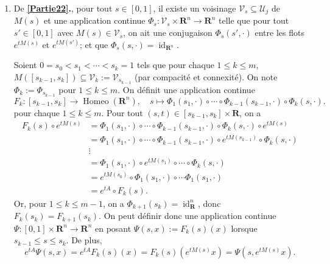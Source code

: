 \documentclass[french, 12pt]{article}
\theoremstyle{definition}
\newcommand{\Rbb}{\mathbf{R}}
\newcommand{\Ucal}{\mathcal{U}}
\newcommand{\Vcal}{\mathcal{V}}
\newcommand{\id}{\operatorname{id}}
\newcommand{\Homeo}{\operatorname{Homeo}}
\newcommand{\diag}{\operatorname{diag}}
\begin{document}
\begin{enumerate}
\begin{enumerate}
        \item De m\^eme, on peut trouver les chemins $c_k$ reliant $C_k$ \`a $\diag[-1,\ldots,-1]$ ($1 \le k \le u$) tel que les valeurs propres de $c_k(t)$ sont n\'egatives pour tout $t \in [0,1]$; et les chemins $d_k$ reliant $D_k$ \`a $\diag[-1,\ldots,-1]$ ($1 \le k \le v$) tel que les valeurs propres de $d_k(t)$ sont de partie r\'eelle n\'egative pour tout $t \in [0,1]$.
        \end{enumerate}
        
        Ainsi, on a un chemin
            $$h:=\diag[a_1,\ldots,a_r,b_1,\ldots,b_s,c_1,\ldots,c_u,d_1,\ldots,d_v] : [0,1] \to \Ucal_j$$
        reliant $h(0) = H$ \`a $h(1) = I_j$. En cons\'equence, on a une chemin
            $$\forall t \in [0,1], \qquad m(t):=p(t)h(t)p(t)^{-1} \in \Ucal_j$$
        reliant $m(0) = PHP^{-1} = M$ \`a $m(1) = I_j$ dans $\Ucal_j$. Donc $\Ucal_j$ est connexe par arcs.
        
        \item \label{Partie24} De {\bf \ref{Partie22}.}, pour tout $s \in [0,1]$, il existe un voisinage $\Vcal_s \subseteq \Ucal_j$ de $M(s)$ et une application continue $\Phi_s: \Vcal_s \times \Rbb^n \to \Rbb^n$ telle que pour tout $s' \in [0,1]$ avec $M(s) \in \Vcal_s$, on ait une conjugaison $\Phi_s(s',\cdot)$ entre les flots $e^{tM(s)}$ et $e^{tM(s')}$; et que $\Phi_s(s,\cdot) = \id_{\Rbb^n}$.
        
        Soient $0 = s_0 < s_1 < \cdots < s_k = 1$ tels que pour chaque $1 \le k \le m$, $M([s_{k-1},s_k]) \subseteq \Vcal_k:=\Vcal_{s_{k-1}}$ (par compacit\'e et connexit\'e). On note $\Phi_k:=\Phi_{s_{k-1}}$ pour $1 \le k \le m$. On d\'efinit une application continue 
            $$F_k: [s_{k-1},s_k] \to \Homeo(\Rbb^n), \quad s \mapsto \Phi_1(s_1,\cdot) \circ \cdots \circ \Phi_{k-1}(s_{k-1},\cdot) \circ  \Phi_k(s,\cdot).$$
        pour chaque $1 \le k \le m$. Pour tout $(s,t) \in [s_{k-1}, s_k] \times \Rbb$, on a
            \begin{align*}
                F_k(s) \circ e^{tM(s)} & = \Phi_1(s_1,\cdot) \circ \cdots \circ \Phi_{k-1}(s_{k-1},\cdot) \circ  \Phi_k(s,\cdot) \circ e^{tM(s)} \\
                & = \Phi_1(s_1,\cdot) \circ \cdots \circ \Phi_{k-1}(s_{k-1},\cdot) \circ e^{tM(s_{k-1})} \circ  \Phi_k(s,\cdot)\\
                & \vdots \\
                & = \Phi_1(s_1,\cdot) \circ e^{tM(s_1)} \circ \cdots \circ  \Phi_k(s,\cdot)\\
                & = e^{tM(s_0)} \circ \Phi_1(s_1,\cdot) \circ \cdots \Phi_1(s_1,\cdot)\\
                & = e^{tA} \circ F_k(s).
            \end{align*}
        Or, pour $1 \le k \le m-1$, on a $\Phi_{k+1}(s_k) = \id_{\Rbb}^n$, donc $F_k(s_k) = F_{k+1}(s_k)$. On peut d\'efinir donc une application continue $\Psi:[0,1] \times \Rbb^n \to \Rbb^n$ en posant $\Psi(s,x):=F_k(s)(x)$ lorsque $s_{k-1} \le s \le s_k$. De plus,
            $$e^{tA}\Psi(s,x) = e^{tA}F_k(s)(x) = F_k(s)(e^{tM(s)}x) = \Psi(s,e^{tM(s)}x).$$
\end{enumerate}
\end{document}
